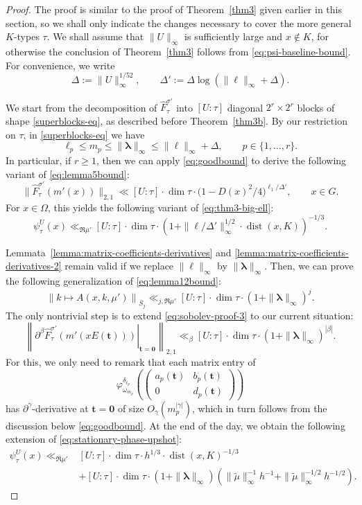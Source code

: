 \documentclass[11pt,oneside]{amsart}
\numberwithin{equation}{section}
\theoremstyle{remark}
\theoremstyle{plain}
\DeclareMathOperator{\dist}{dist}
\newcommand{\bt}{\mathbf{t}}
\renewcommand\leq{\leqslant}
\renewcommand\geq{\geqslant}
\begin{document}
\begin{proof}
The proof is similar to the proof of Theorem~\ref{thm3} given earlier in this section, so we shall only indicate the changes necessary to cover the more general $K$-types $\tau$. We shall assume that $\|U\|_{\infty}$ is sufficiently large and $x\not\in K$, for otherwise the conclusion of Theorem~\ref{thm3} follows from \eqref{eq:psi-baseline-bound}. For convenience, we write
\[\Delta:=\|U\|_\infty^{1/52},\qquad\Delta':=\Delta\log(\|\bm\ell\|_\infty+\Delta).\]

We start from the decomposition of $\hat F_\tau^{\sigma'}$ into $[U:\tau]$ diagonal $2^r\times 2^r$ blocks of shape \eqref{superblocks-eq}, as described before Theorem~\ref{thm3b}. By our restriction on $\tau$, in \eqref{superblocks-eq} we have
\[\ell_p\leq m_p\leq\|\bm\lambda\|_\infty\leq\|\bm\ell\|_\infty+\Delta,\qquad p\in\{1,\dotsc,r\}.\]
In particular, if $r\geq 1$, then we can apply \eqref{eq:goodbound} to derive the following variant of \eqref{eq:lemma5bound}:
\[
\|\hat F_{\tau}^{\sigma'} (m'(x))\|_{2,1}\ll [U:\tau]\cdot\dim \tau \cdot \big(1 - D(x)^2/4 \big)^{\ell_1/\Delta'},\qquad x\in G.
\]
For $x\in\Omega$, this yields the following variant of \eqref{eq:thm3-big-ell}:
\begin{equation}\label{eq:thm3-big-ell-variant}
\psi_{\tau}^{U}(x) \ll_{\Re\mu'} 
[U:\tau]\cdot\dim \tau \cdot \left(1+\|\bm\ell/\Delta'\|_{\infty}^{1/2}\cdot\dist(x,K)\right)^{-1/3}.
\end{equation}

Lemmata~\ref{lemma:matrix-coefficients-derivatives} and \ref{lemma:matrix-coefficients-derivatives-2} remain valid if we replace $\|\bm\ell\|_\infty$ by $\|\bm\lambda\|_\infty$. Then, we can prove the following generalization of \eqref{eq:lemma12bound}:
\[\left\|k\mapsto A(x,k,\mu')\right\|_{S_j}\ll_{j,\Re\mu'} [U:\tau]\cdot\dim \tau \cdot (1+\|\bm\lambda\|_{\infty})^{j}.\]
The only nontrivial step is to extend \eqref{eq:sobolev-proof-3} to our current situation:
\[
\left\| \left. \partial^{\beta} \hat{F}_\tau^{\sigma'}(m'(x E(\bt))) \right|_{\bt=\mathbf{0}} \right\|_{2,1} \ll_{\beta} [U:\tau]\cdot\dim\tau \cdot (1+\|\bm\lambda\|_\infty)^{|\beta|}.
\]
For this, we only need to remark that each matrix entry of
\[\varphi_{\omega_{m_p}}^{\delta_{\ell_p}} \left(\begin{pmatrix} a_p(\bt) & b_p(\bt) \\ 0 & d_p(\bt) \end{pmatrix}\right)\]
has $\partial^\gamma$-derivative at $\bt=\mathbf{0}$ of size $O_\gamma(m_p^{|\gamma|})$, which in turn follows from the discussion below \eqref{eq:goodbound}. At the end of the day, we obtain the following extension of \eqref{eq:stationary-phase-upshot}:
\begin{equation}\label{eq:stationary-phase-upshot-extension}
\begin{split}
\psi_\tau^{U}(x) \ll_{\Re\mu'}
&[U:\tau]\cdot\dim \tau \cdot h^{1/3} \cdot \dist(x,K)^{-1/3}\\
& + [U:\tau]\cdot\dim \tau \cdot (1+\|\bm\lambda\|_{\infty})
\left(\|\tilde{\mu}\|_{\infty}^{-1}h^{-1} + \|\tilde{\mu}\|_{\infty}^{-1/2}h^{-1/2}\right).
\end{split}
\end{equation}


\end{proof}
\end{document}
